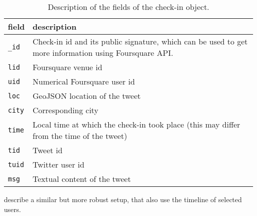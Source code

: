 \begin{table}[ht]
    \centering
    \begin{tabularx}{\textwidth}{lX}
        \toprule
        field & description \\
        \midrule
        \texttt{\_id} & Check-in id and its public signature, which can be used
        to get more information using Foursquare API. \\
        \texttt{lid} & Foursquare venue id \\
        \texttt{uid} & Numerical Foursquare user id \\
        \texttt{loc} & GeoJSON location of the tweet \\
        \texttt{city} & Corresponding city \\
        \texttt{time} & Local time at which the check-in took place (this may differ from the time of the tweet) \\
        \texttt{tid} & Tweet id \\
        \texttt{tuid} & Twitter user id \\
        \texttt{msg} & Textual content of the tweet \\
        \bottomrule
    \end{tabularx}
    \caption[Check-in format]{Description of the fields of the check-in
    object.\label{tab:checkinfields}}
\end{table}

\Textcite{TwitterMongoDB13} describe a similar but more robust setup, that
also use the timeline of selected users.


